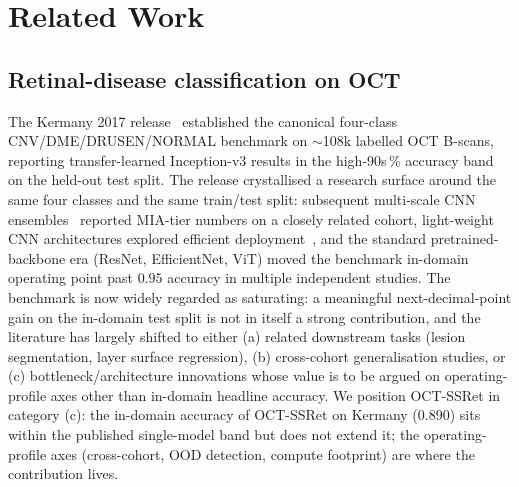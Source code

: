 \documentclass[5p]{elsarticle}
\begin{document}
\section{Related Work}
\label{sec:related}

\subsection{Retinal-disease classification on OCT}
The Kermany 2017 release~\citep{kermany2018identifying} established the canonical four-class CNV/DME/DRUSEN/NORMAL benchmark on $\sim$108k labelled OCT B-scans, reporting transfer-learned Inception-v3 results in the high-90s\,\% accuracy band on the held-out test split. The release crystallised a research surface around the same four classes and the same train/test split: subsequent multi-scale CNN ensembles~\citep{rasti2018macular} reported MIA-tier numbers on a closely related cohort, light-weight CNN architectures explored efficient deployment~\citep{lu2018deep,li2019deep}, and the standard pretrained-backbone era (ResNet, EfficientNet, ViT) moved the benchmark in-domain operating point past $0.95$ accuracy in multiple independent studies. The benchmark is now widely regarded as saturating: a meaningful next-decimal-point gain on the in-domain test split is not in itself a strong contribution, and the literature has largely shifted to either (a) related downstream tasks (lesion segmentation, layer surface regression), (b) cross-cohort generalisation studies, or (c) bottleneck/architecture innovations whose value is to be argued on operating-profile axes other than in-domain headline accuracy. We position OCT-SSRet in category (c): the in-domain accuracy of OCT-SSRet on Kermany ($0.890$) sits within the published single-model band but does not extend it; the operating-profile axes (cross-cohort, OOD detection, compute footprint) are where the contribution lives.
\end{document}
